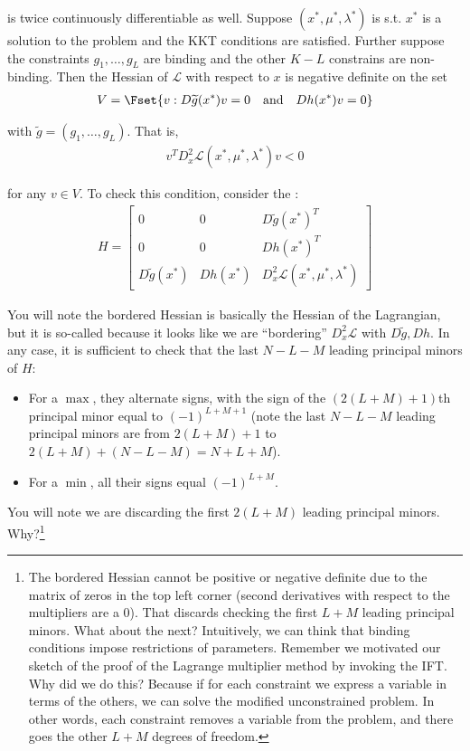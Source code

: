 \documentclass{article}
\begin{document}
is twice continuously differentiable as well. Suppose $(x^*, \mu^*, \lambda^*)$ is s.t. $x^*$ is a solution to the problem and the KKT conditions are satisfied. Further suppose the constraints $g_1, \ldots, g_L$ are binding and the other $K - L$ constrains are non-binding. Then the Hessian of $\mathcal{L}$ with respect to $x$ is negative definite on the set
\begin{align*}
  V = \Fset{v: D \widetilde{g}(x^*) v = 0 \quad\text{and}\quad Dh(x^*) v = 0}
\end{align*}

with $\widetilde{g} = (g_1, \ldots, g_L)$. That is,
\begin{align*}
  v^T D^2_x \mathcal{L}(x^*, \mu^*, \lambda^*) v < 0
\end{align*}

for any $v \in V$. To check this condition, consider the :
\begin{align*}
  H
  =
  \begin{bmatrix}
    0                    & 0        & D \widetilde{g}(x^*)^T \\
    0                    & 0        & D h(x^*)^T \\
    D \widetilde{g}(x^*) & D h(x^*) & D^2_x \mathcal{L}(x^*, \mu^*, \lambda^*)
  \end{bmatrix}
\end{align*}

You will note the bordered Hessian is basically the Hessian of the Lagrangian, but it is so-called because it looks like we are ``bordering'' $D^2_x \mathcal{L}$ with $D \widetilde{g}, Dh$. In any case, it is sufficient to check that the last $N - L - M$ leading principal minors of $H$:
\begin{itemize}[label=$\bullet$]
  \item For a $\max$, they alternate signs, with the sign of the $(2(L + M) + 1)$th principal minor equal to $(-1)^{L + M + 1}$ (note the last $N - L - M$ leading principal minors are from $2(L + M) + 1$ to $2(L + M) + (N - L - M) = N + L + M$).
  \item For a $\min$, all their signs equal $(-1)^{L + M}$.
\end{itemize}

You will note we are discarding the first $2(L + M)$ leading principal minors. Why?\footnote{The bordered Hessian cannot be  positive or negative definite due to the  matrix of  zeros in the top left corner (second derivatives with respect to the multipliers are a $0$). That discards checking the first $L + M$ leading principal minors. What about the next? Intuitively, we can think that binding conditions impose restrictions of parameters. Remember we motivated our sketch of the proof of the Lagrange multiplier method by invoking the IFT. Why did we do this? Because if for each constraint we express a variable in terms  of the others, we can solve the modified unconstrained problem. In other words, each constraint removes a variable from the problem, and there goes the other $L + M$ degrees of freedom.}
\end{document}
